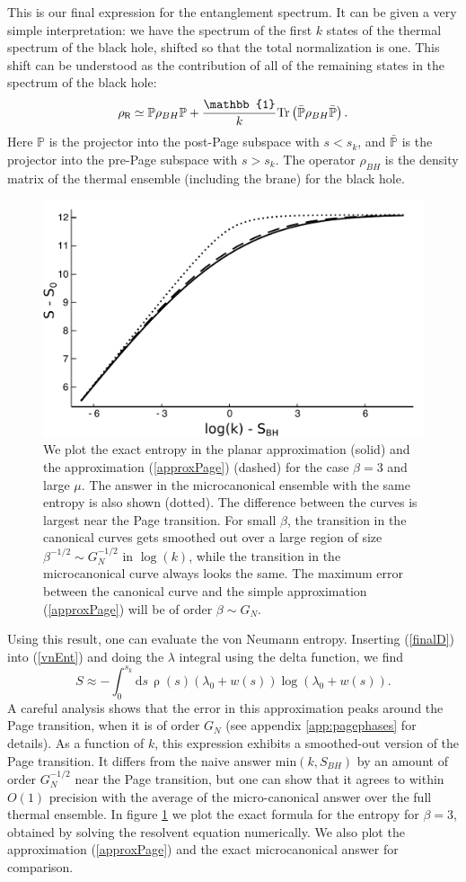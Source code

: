 \documentclass[11pt]{article}
\newcommand{\be}{\begin{equation}}
\newcommand{\ee}{\end{equation}}
\numberwithin{equation}{section}
\def\tr{\text{Tr}}
\begin{document}
This is our final expression for the entanglement spectrum. It can be given a very simple interpretation: we have the spectrum of the first $k$ states of the thermal spectrum of the black hole, shifted so that the total normalization is one. This shift can be understood as the contribution of all of the remaining states in the spectrum of the black hole:
\be
\rho_{\sf{R}}\simeq \mathbb{P} \rho_{BH} \mathbb{P}+{\mathbb{1}\over k}\tr\left(\mathbb{ \bar P} \rho_{BH}\mathbb{\bar P }\right).
\ee
Here $\mathbb{P}$ is the projector into the post-Page subspace with $s < s_k$, and $\mathbb{\bar P}$ is the projector into the pre-Page subspace with $s > s_k$. The operator $\rho_{BH}$ is the density matrix of the thermal ensemble (including the brane) for the black hole.

\begin{figure}[t]
\begin{center}
\includegraphics[width = .45\textwidth]{images/pagecurve2.pdf}
\caption{{\small We plot the exact entropy in the planar approximation (solid) and the approximation (\ref{approxPage}) (dashed) for the case $\beta = 3$ and large $\mu$. The answer in the microcanonical ensemble with the same entropy is also shown (dotted). The difference between the curves is largest near the Page transition. For small $\beta$, the transition in the canonical curves gets smoothed out over a large region of size $\beta^{-1/2} \sim G_N^{-1/2}$ in $\log(k)$, while the transition in the microcanonical curve always looks the same. The maximum error between the canonical curve and the simple approximation (\ref{approxPage}) will be of order $\beta \sim G_N$.}}\label{fig:entropy}
\end{center}
\end{figure}
Using this result, one can evaluate the von Neumann entropy. Inserting (\ref{finalD}) into (\ref{vnEnt}) and doing the $\lambda$ integral using the delta function, we find
\be
	S\approx -\int_0^{s_k}\mathrm{d}s\,\uprho(s)(\lambda_0+w(s))\log(\lambda_0+w(s)).\label{approxPage}
\ee
A careful analysis shows that the error in this approximation peaks around the Page transition, when it is of order $G_N$ (see appendix \ref{app:pagephases} for details). As a function of $k$, this expression exhibits a smoothed-out version of the Page transition. It differs from the naive answer $\text{min}(k,S_{BH})$ by an amount of order $G_N^{-1/2}$ near the Page transition, but one can show that it agrees to within $O(1)$ precision with the average of the micro-canonical answer over the full thermal ensemble. In figure \ref{fig:entropy} we plot the exact formula for the entropy for $\beta = 3$, obtained by solving the resolvent equation numerically. We also plot the approximation (\ref{approxPage}) and the exact microcanonical answer for comparison.
\end{document}
